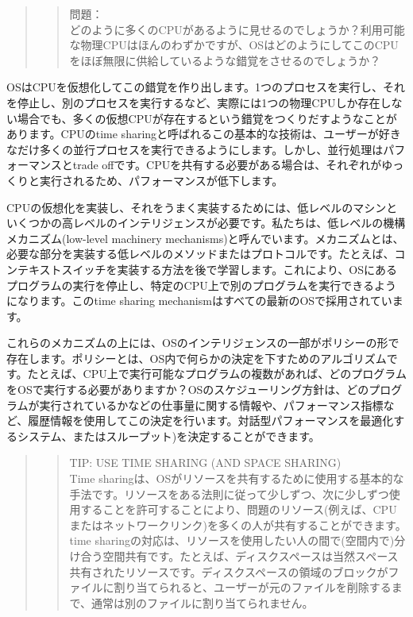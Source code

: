 \begin{quote}
\begin{quote}
問題：\\
どのように多くのCPUがあるように見せるのでしょうか？利用可能な物理CPUはほんのわずかですが、OSはどのようにしてこのCPUをほぼ無限に供給しているような錯覚をさせるのでしょうか？
\end{quote}
\end{quote}

OSはCPUを仮想化してこの錯覚を作り出します。1つのプロセスを実行し、それを停止し、別のプロセスを実行するなど、実際には1つの物理CPUしか存在しない場合でも、多くの仮想CPUが存在するという錯覚をつくりだすようなことがあります。CPUのtime
sharingと呼ばれるこの基本的な技術は、ユーザーが好きなだけ多くの並行プロセスを実行できるようにします。しかし、並行処理はパフォーマンスとtrade
offです。CPUを共有する必要がある場合は、それぞれがゆっくりと実行されるため、パフォーマンスが低下します。

CPUの仮想化を実装し、それをうまく実装するためには、低レベルのマシンといくつかの高レベルのインテリジェンスが必要です。私たちは、低レベルの機構メカニズム(low-level
machinery
mechanisms)と呼んでいます。メカニズムとは、必要な部分を実装する低レベルのメソッドまたはプロトコルです。たとえば、コンテキストスイッチを実装する方法を後で学習します。これにより、OSにあるプログラムの実行を停止し、特定のCPU上で別のプログラムを実行できるようになります。このtime
sharing mechanismはすべての最新のOSで採用されています。

これらのメカニズムの上には、OSのインテリジェンスの一部がポリシーの形で存在します。ポリシーとは、OS内で何らかの決定を下すためのアルゴリズムです。たとえば、CPU上で実行可能なプログラムの複数があれば、どのプログラムをOSで実行する必要がありますか？OSのスケジューリング方針は、どのプログラムが実行されているかなどの仕事量に関する情報や、パフォーマンス指標など、履歴情報を使用してこの決定を行います。対話型パフォーマンスを最適化するシステム、またはスループット)を決定することができます。

\begin{quote}
\begin{quote}
TIP: USE TIME SHARING (AND SPACE SHARING)\\
Time
sharingは、OSがリソースを共有するために使用する基本的な手法です。リソースをある法則に従って少しずつ、次に少しずつ使用することを許可することにより、問題のリソース(例えば、CPUまたはネットワークリンク)を多くの人が共有することができます。time
sharingの対応は、リソースを使用したい人の間で(空間内で)分け合う空間共有です。たとえば、ディスクスペースは当然スペース共有されたリソースです。ディスクスペースの領域のブロックがファイルに割り当てられると、ユーザーが元のファイルを削除するまで、通常は別のファイルに割り当てられません。
\end{quote}
\end{quote}

